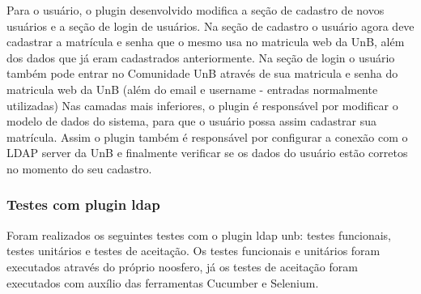 %
Para o usuário, o plugin desenvolvido modifica a seção de cadastro de novos usuários 
e a seção de login de usuários. Na seção de cadastro o usuário agora deve cadastrar a 
matrícula e senha que o mesmo usa no matricula web da UnB, além dos dados que já eram 
cadastrados anteriormente. Na seção de login o usuário também pode entrar no Comunidade 
UnB através de sua matricula e senha do matricula web da UnB (além do email e username 
- entradas normalmente utilizadas)
%
Nas camadas mais inferiores, o plugin é responsável por modificar o modelo de dados do 
sistema, para que o usuário possa assim cadastrar sua matrícula. Assim o plugin também é responsável por configurar a conexão com o LDAP server da UnB e finalmente verificar se 
os dados do usuário estão corretos no momento do seu cadastro.
\subsubsection{Testes com plugin ldap}
%
Foram realizados os seguintes testes  com o plugin ldap unb: testes funcionais, testes 
unitários e testes de aceitação. Os testes funcionais e unitários foram executados através 
do próprio noosfero, já os testes de aceitação foram executados com auxílio das ferramentas Cucumber e Selenium.
%
